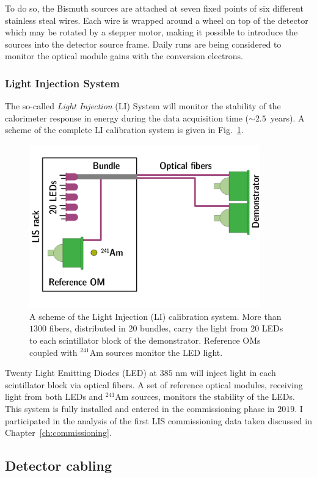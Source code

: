 To do so, the Bismuth sources are attached at seven fixed points of six different stainless steal wires.
Each wire is wrapped around a wheel on top of the detector which may be rotated by a stepper motor, making it possible to introduce the sources into the detector source frame.
Daily runs are being considered to monitor the optical module gains with the conversion electrons.

\subsubsection*{Light Injection System}


The so-called \emph{Light Injection} (LI) System will monitor the stability of the calorimeter response in energy during the data acquisition time ($\sim2.5$~years).
A scheme of the complete LI calibration system is given in Fig.~\ref{fig:LIS_scheme}.
\begin{figure}[h]
  \centering
  \includegraphics[width=10cm]{SNdemonstrator/fig_SNdemonstrator/LIS_scheme.pdf}
  \caption{A scheme of the Light Injection (LI) calibration system.
    More than $1300$ fibers, distributed in $20$ bundles, carry the light from $20$ LEDs to each scintillator block of the demonstrator.
    Reference OMs coupled with $^{241}$Am sources monitor the LED light.
    \label{fig:LIS_scheme}}
\end{figure}
Twenty Light Emitting Diodes (LED) at $385$ nm will inject light in each scintillator block via optical fibers.
A set of reference optical modules, receiving light from both LEDs and $^{241}$Am sources, monitors the stability of the LEDs.
This system is fully installed and entered in the commissioning phase in $2019$.
I participated in the analysis of the first LIS commissioning data taken discussed in Chapter~\ref{ch:commissioning}.


\subsection{Detector cabling}

